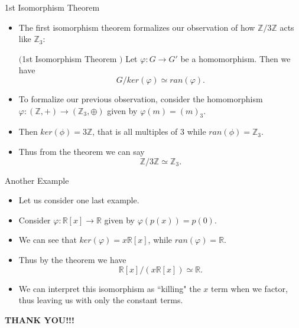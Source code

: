 \documentclass[ %
 10pt, xcolor={dvipsnames,svgnames,x11names,hyperref},
   hyperref={colorlinks=true,citecolor=green,linkcolor=DarkRed,urlcolor=ProcessBlue,anchorcolor=blue}
  ]{beamer}
\newenvironment{stepitemize}{\begin{itemize}[<+->]}{\end{itemize} }
\newcommand{\Z}{\mathbb{Z}}
\newcommand{\R}{\mathbb{R}}
\begin{document}
\begin{frame}{1st Isomorphism Theorem}
\begin{stepitemize}
\item The first isomorphism theorem formalizes our observation of how $\Z/3\Z$ acts like $\Z_3$:
\begin{theorem}$($1st Isomorphism Theorem $)$
Let $\varphi: G\rightarrow G'$ be a homomorphism. Then we have
$$G/ker(\varphi) \simeq ran(\varphi).$$
\end{theorem}
\item To formalize our previous observation, consider the homomorphism $\varphi:(\Z,+) \rightarrow (\Z_3, \oplus)$ given by $\varphi(m) = (m)_3$.
\item Then $ker(\phi) = 3\Z$, that is all multiples of $3$ while $ran(\phi) = \Z_3$.
\item Thus from the theorem we can say
    $$\Z/3\Z \simeq \Z_3.$$
\end{stepitemize}
\end{frame}

\begin{frame}{Another Example}
\begin{stepitemize}
    \item Let us consider one last example.
    \item Consider $\varphi:\R[x]\rightarrow \R$ given by $\varphi(p(x)) = p(0)$.
    \item We can see that $ker(\varphi) = x\R[x]$, while $ran(\varphi)=\R$.
    \item Thus by the theorem we have
    $$\R[x]/(x\R[x]) \simeq \R.$$
    \item We can interpret this isomorphism as ``killing" the $x$ term when we factor, thus leaving us with only the constant terms.
\end{stepitemize}
\end{frame}
\begin{frame}

\centerline{ \color{blue} \bf{\large THANK YOU!!!}}

\end{frame}
\end{document}
